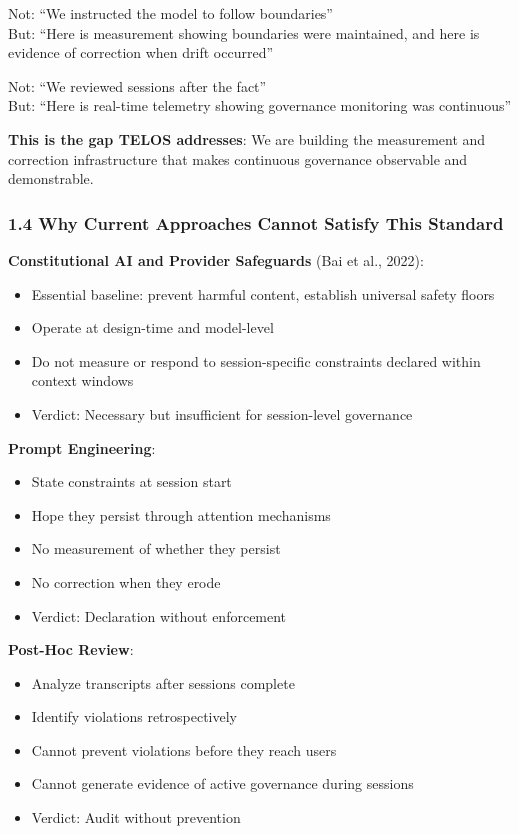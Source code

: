 Not: ``We instructed the model to follow boundaries''\\
But: ``Here is measurement showing boundaries were maintained, and here
is evidence of correction when drift occurred''

Not: ``We reviewed sessions after the fact''\\
But: ``Here is real-time telemetry showing governance monitoring was
continuous''

\textbf{This is the gap TELOS addresses}: We are building the
measurement and correction infrastructure that makes continuous
governance observable and demonstrable.

\subsubsection{1.4 Why Current Approaches Cannot Satisfy This
Standard}\label{why-current-approaches-cannot-satisfy-this-standard}

\textbf{Constitutional AI and Provider Safeguards} (Bai et al., 2022):

\begin{itemize}
\tightlist
\item
  Essential baseline: prevent harmful content, establish universal
  safety floors
\item
  Operate at design-time and model-level
\item
  Do not measure or respond to session-specific constraints declared
  within context windows
\item
  Verdict: Necessary but insufficient for session-level governance
\end{itemize}

\textbf{Prompt Engineering}:

\begin{itemize}
\tightlist
\item
  State constraints at session start
\item
  Hope they persist through attention mechanisms
\item
  No measurement of whether they persist
\item
  No correction when they erode
\item
  Verdict: Declaration without enforcement
\end{itemize}

\textbf{Post-Hoc Review}:

\begin{itemize}
\tightlist
\item
  Analyze transcripts after sessions complete
\item
  Identify violations retrospectively
\item
  Cannot prevent violations before they reach users
\item
  Cannot generate evidence of active governance during sessions
\item
  Verdict: Audit without prevention
\end{itemize}

